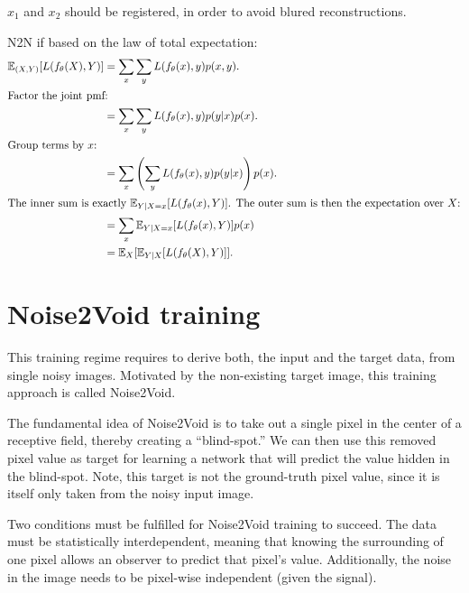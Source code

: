 $x_1$ and $x_2$ should be registered, in order to avoid blured
reconstructions. %

N2N if based on the law of total expectation:
\begin{align*}
\mathbb{E}_{(X,Y)}[L(f_{\theta}(X),Y)] &= \sum_{x}\sum_{y}L(f_{\theta}(x),y) p(x,y). \\
\intertext{Factor the joint pmf:}
&= \sum_{x}\sum_{y}L(f_{\theta}(x),y) p(y|x) p(x). \\
\intertext{Group terms by $x$:}
&= \sum_{x}\left(\sum_{y}L(f_{\theta}(x),y) p(y|x)\right) p(x). \\
\intertext{The inner sum is exactly $\mathbb{E}_{Y|X=x}[L(f_{\theta}(x),Y)]$. The outer sum is then the expectation over $X$:}
&= \sum_{x} \mathbb{E}_{Y|X=x}[L(f_{\theta}(x),Y)] p(x) \\
&= \mathbb{E}_{X}[\mathbb{E}_{Y|X}[L(f_{\theta}(X),Y)]].
\end{align*}

\section{Noise2Void training}

This training regime requires to derive both, the input and the target
data, from single noisy images. Motivated by the non-existing target
image, this training approach is called Noise2Void. %


The fundamental idea of Noise2Void is to take out a single pixel in
the center of a receptive field, thereby creating a “blind-spot.” We
can then use this removed pixel value as target for learning a network
that will predict the value hidden in the blind-spot. Note, this
target is not the ground-truth pixel value, since it is itself only
taken from the noisy input image. %

Two conditions must be fulfilled for Noise2Void training to
succeed. The data must be statistically interdependent, meaning that
knowing the surrounding of one pixel allows an observer to predict
that pixel’s value. Additionally, the noise in the image needs to be
pixel-wise independent (given the signal). %

